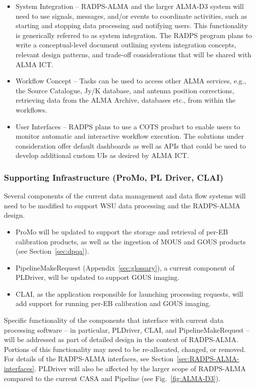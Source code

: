 \begin{itemize}[itemsep=-0.5em]
    \item System Integration -- RADPS-ALMA and the larger ALMA-D3 system will need to use signals, messages, and/or events to coordinate activities, such as starting and stopping data processing and notifying users. This functionality is generically referred to as system integration. The RADPS program plans to write a conceptual-level document outlining system integration concepts, relevant design patterns, and trade-off considerations that will be shared with ALMA ICT. 
    \item Workflow Concept -- Tasks can be used to access other ALMA services, e.g., the Source Catalogue, Jy/K database, and antenna position corrections, retrieving data from the ALMA Archive, databases etc., from within the workflows. 
    \item User Interfaces -- RADPS plans to use a \ac{COTS} product to enable users to monitor automatic and interactive workflow execution. The solutions under consideration offer default dashboards as well as APIs that could be used to develop additional custom UIs as desired by ALMA ICT. 
\end{itemize} 

\subsubsection{Supporting Infrastructure (ProMo, PL Driver, CLAI)}
\label{sec:dp-support-infra}

Several components of the current data management and data flow systems will need to be modified to support WSU data processing and the RADPS-ALMA design. 
\begin{itemize}[itemsep=-0.5em]
\item ProMo will be updated to support the storage and retrieval of per-EB calibration products, as well as the ingestion of MOUS and GOUS products  (see Section~\ref{sec:dpqa}).
\item PipelineMakeRequest (Appendix~\ref{sec:glossary}), a current component of PLDriver, will be updated to support GOUS imaging. 
\item \ac{CLAI}, as the application responsible for launching processing requests, will add support for running per-EB calibration and GOUS imaging.  
\end{itemize}

Specific functionality of the components that interface with current data processing software -- in particular, PLDriver, \ac{CLAI}, and PipelineMakeRequest -- will be addressed as part of detailed design in the context of RADPS-ALMA. Portions of this functionality may need to be re-allocated, changed, or removed. For details of the RADPS-ALMA interfaces, see Section~\ref{sec:RADPS-ALMA-interfaces}. PLDriver will also be affected by the larger scope of RADPS-ALMA compared to the current CASA and Pipeline (see Fig.~\ref{fig:ALMA-D3}).


